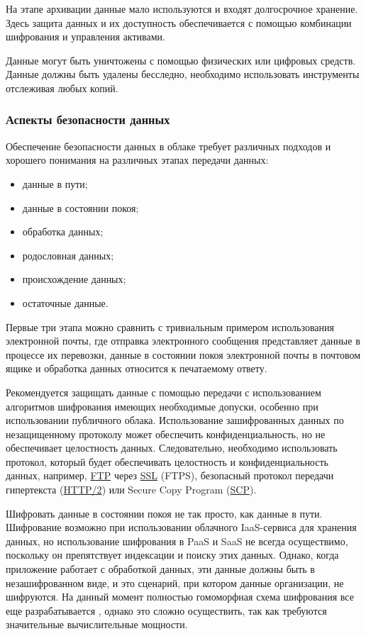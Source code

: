 На этапе архивации данные мало используются и входят долгосрочное хранение.
Здесь защита данных и их доступность обеспечивается с помощью комбинации шифрования и управления активами.

Данные могут быть уничтожены с помощью физических или цифровых средств.
Данные должны быть удалены бесследно, необходимо использовать инструменты отслеживая любых копий.

\subsubsection{Аспекты безопасности данных}

Обеспечение безопасности данных в облаке требует различных подходов и хорошего понимания на различных этапах передачи данных:
\begin{itemize}
  \item данные в пути;
  \item данные в состоянии покоя;
  \item обработка данных;
  \item родословная данных;
  \item происхождение данных;
  \item остаточные данные.
\end{itemize}

Первые три этапа можно сравнить с тривиальным примером использования электронной почты, где отправка электронного сообщения представляет данные в процессе их перевозки, данные в состоянии покоя электронной почты в почтовом ящике и обработка данных относится к печатаемому ответу.

Рекомендуется защищать данные с помощью передачи с использованием алгоритмов шифрования имеющих необходимые допуски, особенно при использовании публичного облака.
Использование зашифрованных данных по незащищенному протоколу может обеспечить конфиденциальность, но не обеспечивает целостность данных.
Следовательно, необходимо использовать протокол, который будет обеспечивать целостность и конфиденциальность данных, например, \hyperlink{ftp}{FTP} через \hyperlink{ssl}{SSL} (FTPS), безопасный протокол передачи гипертекста (\hyperlink{http}{HTTP/2}) или Secure Copy Program (\hyperlink{scp}{SCP}).

Шифровать данные в состоянии покоя не так просто, как данные в пути.
Шифрование возможно при использовании облачного IaaS-сервиса для хранения данных, но использование шифрования в PaaS и SaaS не всегда осуществимо, поскольку он препятствует индексации и поиску этих данных.
Однако, когда приложение работает с обработкой данных, эти данные должны быть в незашифрованном виде, и это сценарий, при котором данные организации, не шифруются.
На данный момент полностью гомоморфная схема шифрования все еще разрабатывается \cite{ibm}, однако это сложно осуществить, так как требуются значительные вычислительные мощности.

